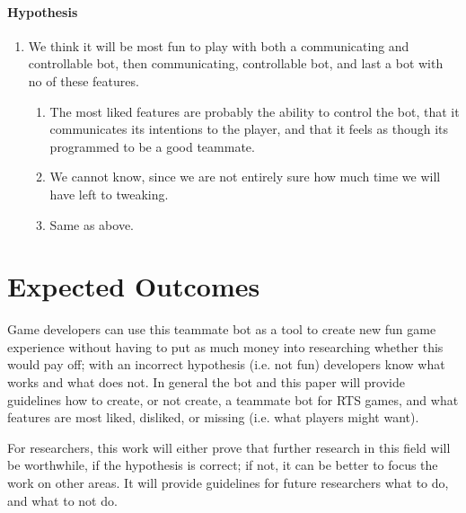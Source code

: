 \paragraph{Hypothesis}
\begin{enumerate}
	\item We think it will be most fun to play with both a communicating and controllable bot, then communicating, controllable bot, and last a bot with no of these features.
	\begin{enumerate}
		\item The most liked features are probably the ability to control the bot, that it communicates its intentions to the player, and that it feels as though its programmed to be a good teammate.
		\item We cannot know, since we are not entirely sure how much time we will have left to tweaking.
		\item Same as above.
	\end{enumerate}
\end{enumerate}

\section{Expected Outcomes}
Game developers can use this teammate bot as a tool to create new fun game experience without having to put as much money into researching whether this would pay off; with an incorrect hypothesis (i.e. not fun) developers know what works and what does not. In general the bot and this paper will provide guidelines how to create, or not create, a teammate bot for RTS games, and what features are most liked, disliked, or missing (i.e. what players might want).

For researchers, this work will either prove that further research in this field will be worthwhile, if the hypothesis is correct; if not, it can be better to focus the work on other areas. It will provide guidelines for future researchers what to do, and what to not do.